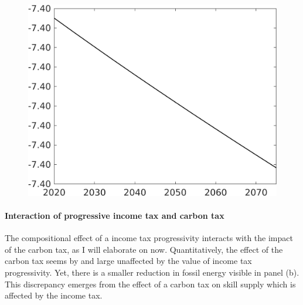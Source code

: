 \begin{figure}[h!!]
\begin{minipage}[]{0.32\textwidth}
 	\end{minipage}
 	\begin{minipage}[]{0.32\textwidth}
 		\includegraphics[width=1\textwidth]{../../codding_model/own_basedOnFried/optimalPol_010922_revision/figures/all_13Sept22/CompTaufPER_bytaul_Reg0_hhhl_spillover0_nsk0_xgr0_knspil0_sep0_LFlimit0_emsbase0_countec0_GovRev0_etaa0.79_lgd0.png}
 	\end{minipage}
 \end{figure}
 
  
\paragraph{Interaction of progressive income tax and carbon tax}
The compositional effect of a income tax progressivity interacts with the impact of the carbon tax, as I will elaborate on now.
  Quantitatively, the effect of the carbon tax seems by and large unaffected by the value of income tax progressivity.
 Yet, there is a smaller reduction in fossil energy visible in panel (b).
This discrepancy emerges from the effect of a carbon tax on skill supply which is affected by the income tax. 

